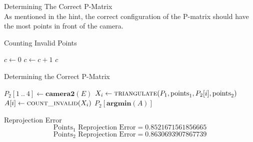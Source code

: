 \begin{enumarabic}
  \item Determining The Correct P-Matrix \\
    As mentioned in the hint, the correct configuration of the P-matrix
    should have the most points in front of the camera.

    \begin{center}
      \begin{minipage}{.6\textwidth}
        \begin{answer}
          \begin{algorithm}[H]
            \caption{Counting Invalid Points}
            \begin{algorithmic}[1]
                \State $c \gets 0$
                    \State $c \gets c + 1$
                  \EndIf
                \EndFor
                \State \Return $c$
              \EndFunction
            \end{algorithmic}
          \end{algorithm}
          \begin{algorithm}[H]
            \caption{Determining the Correct P-Matrix}
            \begin{algorithmic}[1]
              \State $P_2[1\ ..\ 4] \gets \mathbf{camera2}(E)$
                \State $X_i \gets \textsc{triangulate}(P_1, \text{points}_1, P_2[i], \text{points}_2)$
                \State $A[i] \gets \textsc{count\_invalid}(X_i)$
              \EndFor
              \State \Return $P_2[\mathbf{argmin}(A)]$
            \end{algorithmic}
          \end{algorithm}
        \end{answer}
      \end{minipage}
    \end{center}

  \step
  \item Reprojection Error
    \[ 
      \text{Points$_1$ Reprojection Error} = 0.8521671561856665
    \]
    \[
      \text{Points$_2$ Reprojection Error} = 0.8630693907867739
    \]
    
\end{enumarabic}

